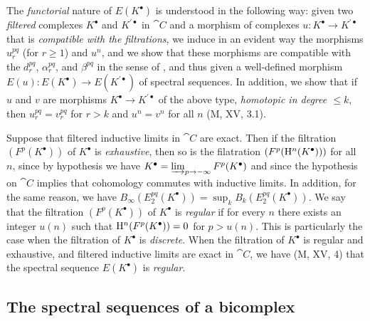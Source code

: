 
\begin{env}[11.2.3]
\label{0.11.2.3}
The \emph{functorial} nature of $E(K^\bullet)$ is understood in the following way: given two \emph{filtered} complexes $K^\bullet$ and $K^{\prime\bullet}$ in $\cat{C}$ and a morphism of complexes $u:K^\bullet\to K^{\prime\bullet}$ that is \emph{compatible with the filtrations}, we induce in an evident way the morphisms $u_r^{pq}$ (for $r\geq 1$) and $u^n$, and we show that these morphisms are compatible with the $d_r^{pq}$, $\alpha_r^{pq}$, and $\beta^{pq}$ in the sense of , and thus given a well-defined morphism $E(u):E(K^\bullet)\to E(K^{\prime\bullet})$ of spectral sequences.
In addition, we show that if $u$ and $v$ are morphisms $K^\bullet\to K^{\prime\bullet}$ of the above type, \emph{homotopic in degree $\leq k$}, then $u_r^{pq}=v_r^{pq}$ for $r>k$ and $u^n=v^n$ for all $n$ (M, XV, 3.1).
\end{env}

\begin{env}[11.2.4]
\label{0.11.2.4}
Suppose that filtered inductive limits in $\cat{C}$ are exact.
Then if the filtration $(F^p(K^\bullet))$ of $K^\bullet$ is \emph{exhaustive}, then so is the filatration $(F^p(\mathrm{H}^n(K^\bullet)))$ for all $n$, since by hypothesis we have $K^\bullet=\varinjlim_{p\to-\infty}F^p(K^\bullet)$ and since the hypothesis on $\cat{C}$ implies that cohomology commutes with inductive limits.
In addition, for the same reason, we have $B_\infty(E_2^{pq}(K^\bullet))=\sup_k B_k(E_2^{pq}(K^\bullet))$.
We say that the filtration $(F^p(K^\bullet))$ of $K^\bullet$ is \emph{regular} if for every $n$ there exists an integer $u(n)$ such that $\mathrm{H}^n(F^p(K^\bullet))=0$ for $p>u(n)$.
This is particularly the case when the filtration of $K^\bullet$ is \emph{discrete}.
When the filtration of $K^\bullet$ is regular and exhaustive, and filtered inductive limits are exact in $\cat{C}$, we have (M, XV, 4) that the spectral sequence $E(K^\bullet)$ is \emph{regular}.
\end{env}

\subsection{The spectral sequences of a bicomplex}
\label{subsection:0.11.4}


